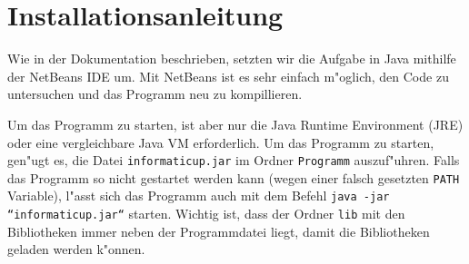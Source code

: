\section{Installationsanleitung}
Wie in der Dokumentation beschrieben, setzten wir die Aufgabe in Java mithilfe der NetBeans
IDE um. Mit NetBeans ist es sehr einfach m"oglich, den Code zu untersuchen und das Programm neu zu kompillieren. 

Um das Programm zu starten, ist  aber nur die Java Runtime Environment (JRE) oder eine vergleichbare Java VM erforderlich. Um das Programm zu starten, gen"ugt es, die Datei \texttt{informaticup.jar} im Ordner \texttt{Programm} auszuf"uhren. Falls das Programm so nicht gestartet werden kann (wegen einer falsch gesetzten \texttt{PATH} Variable), l"asst sich das Programm auch mit dem Befehl \texttt{java -jar ``informaticup.jar``} starten. Wichtig ist, dass der Ordner \texttt{lib} mit den Bibliotheken immer neben der Programmdatei liegt, damit die Bibliotheken geladen werden k"onnen.